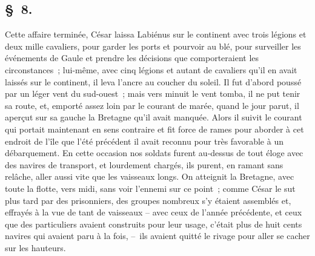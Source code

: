 \documentclass[french,twoside]{book} %
\begin{document}
\subsection[{§ 8.}]{ \textsc{§ 8.} }
\noindent Cette affaire terminée, César laissa Labiénus sur le continent avec trois légions et deux mille cavaliers, pour garder les ports et pourvoir au blé, pour surveiller les événements de Gaule et prendre les décisions que comporteraient les circonstances ; lui-même, avec cinq légions et autant de cavaliers qu’il en avait laissés sur le continent, il leva l’ancre au coucher du soleil. Il fut d’abord poussé par un léger vent du sud-ouest ; mais vers minuit le vent tomba, il ne put tenir sa route, et, emporté assez loin par le courant de marée, quand le jour parut, il aperçut sur sa gauche la Bretagne qu’il avait manquée. Alors il suivit le courant qui portait maintenant en sens contraire et fit force de rames pour aborder à cet endroit de l’île que l’été précédent il avait reconnu pour très favorable à un débarquement. En cette occasion nos soldats furent au-dessus de tout éloge avec des navires de transport, et lourdement chargés, ils purent, en ramant sans relâche, aller aussi vite que les vaisseaux longs. On atteignit la Bretagne, avec toute la flotte, vers midi, sans voir l’ennemi sur ce point ; comme César le sut plus tard par des prisonniers, des groupes nombreux s’y étaient assemblés et, effrayés à la vue de tant de vaisseaux – avec ceux de l’année précédente, et ceux que des particuliers avaient construits pour leur usage, c’était plus de huit cents navires qui avaient paru à la fois, – ils avaient quitté le rivage pour aller se cacher sur les hauteurs.
\end{document}
